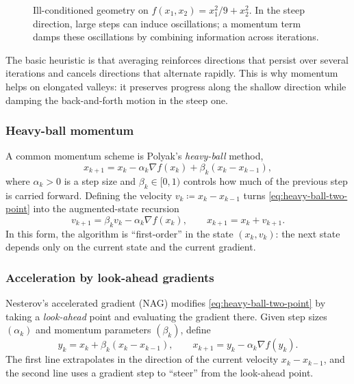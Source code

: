 \begin{figure}[t]
  \centering
  
  \caption{Ill-conditioned geometry on $f(x_1,x_2)=x_1^2/9+x_2^2$.
  In the steep direction, large steps can induce oscillations; a momentum term damps these oscillations by combining information across iterations.}
  \label{fig:momentum-ill-conditioned}
\end{figure}

The basic heuristic is that averaging reinforces directions that persist over several iterations and cancels directions that alternate rapidly.
This is why momentum helps on elongated valleys: it preserves progress along the shallow direction while damping the back-and-forth motion in the steep one.

\subsubsection{Heavy-ball momentum}
\label{subsubsec:heavy-ball}

A common momentum scheme is Polyak's \emph{heavy-ball} method,
\begin{equation}
  x_{k+1} = x_k - \alpha_k \nabla f(x_k) + \beta_k (x_k-x_{k-1}),
  \label{eq:heavy-ball-two-point}
\end{equation}
where $\alpha_k>0$ is a step size and $\beta_k\in[0,1)$ controls how much of the previous step is carried forward.
Defining the velocity $v_k \coloneqq x_k-x_{k-1}$ turns \eqref{eq:heavy-ball-two-point} into the augmented-state recursion
\begin{equation}
  v_{k+1} = \beta_k v_k - \alpha_k \nabla f(x_k),
  \qquad
  x_{k+1} = x_k + v_{k+1}.
  \label{eq:heavy-ball-velocity}
\end{equation}
In this form, the algorithm is ``first-order'' in the state $(x_k,v_k)$: the next state depends only on the current state and the current gradient.

\subsubsection{Acceleration by look-ahead gradients}
\label{subsubsec:nag}

Nesterov's accelerated gradient (NAG) modifies \cref{eq:heavy-ball-two-point} by taking a \emph{look-ahead} point and evaluating the gradient there.
Given step sizes $(\alpha_k)$ and momentum parameters $(\beta_k)$, define
\begin{equation}
  y_k = x_k + \beta_k(x_k-x_{k-1}),
  \qquad
  x_{k+1} = y_k - \alpha_k \nabla f(y_k).
  \label{eq:nag-two-point}
\end{equation}
The first line extrapolates in the direction of the current velocity $x_k-x_{k-1}$, and the second line uses a gradient step to ``steer'' from the look-ahead point.

